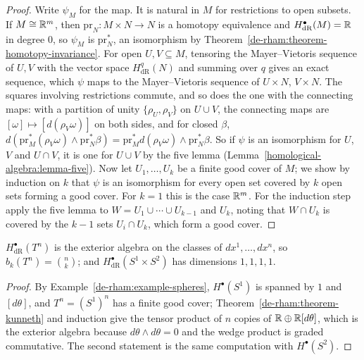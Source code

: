 \begin{proof}
Write $\psi_M$ for the map. It is natural in $M$ for restrictions to open subsets. If $M \cong \mathbb{R}^m$, then $\mathrm{pr}_N \colon M \times N \to N$ is a homotopy equivalence and $H^\bullet_{\mathrm{dR}}(M) = \mathbb{R}$ in degree $0$, so $\psi_M$ is
$\mathrm{pr}_N^*$, an isomorphism by Theorem~\ref{de-rham:theorem-homotopy-invariance}. For open $U, V \subseteq M$, tensoring the Mayer--Vietoris sequence of $U, V$ with the vector space $H^q_{\mathrm{dR}}(N)$ and summing over $q$ gives an
exact sequence, which $\psi$ maps to the Mayer--Vietoris sequence of $U \times N$, $V \times N$. The squares involving restrictions commute, and so does the one with the connecting maps: with a partition of unity $\{\rho_U, \rho_V\}$ on
$U \cup V$, the connecting maps are $[\omega] \mapsto [d(\rho_V\omega)]$ on both sides, and for closed $\beta$, $d(\mathrm{pr}_M^*(\rho_V\omega) \wedge \mathrm{pr}_N^*\beta) = \mathrm{pr}_M^*d(\rho_V\omega) \wedge \mathrm{pr}_N^*\beta$. So if $\psi$ is an isomorphism for $U$, $V$ and $U \cap V$, it is one for $U \cup V$
by the five lemma (Lemma~\ref{homological-algebra:lemma-five}). Now let $U_1, \ldots, U_k$ be a finite good cover of $M$; we show by induction on $k$ that $\psi$ is an isomorphism for every open set covered by $k$ open sets forming a good
cover. For $k = 1$ this is the case $\mathbb{R}^m$. For the induction step apply the five lemma to $W = U_1 \cup \cdots \cup U_{k-1}$ and $U_k$, noting that $W \cap U_k$ is covered by the $k - 1$ sets $U_i \cap U_k$, which form a good cover.
\end{proof}

\begin{corollary}\label{de-rham:corollary-torus}
$H^\bullet_{\mathrm{dR}}(T^n)$ is the exterior algebra on the classes of $dx^1, \ldots, dx^n$, so $b_k(T^n) = \binom nk$; and $H^\bullet_{\mathrm{dR}}(S^1 \times S^2)$ has dimensions $1, 1, 1, 1$.
\end{corollary}

\begin{proof}
By Example~\ref{de-rham:example-spheres}, $H^\bullet(S^1)$ is spanned by $1$ and $[d\theta]$, and $T^n = (S^1)^n$ has a finite good cover; Theorem~\ref{de-rham:theorem-kunneth} and induction give the tensor product of $n$ copies of
$\mathbb{R} \oplus \mathbb{R}[d\theta]$, which is the exterior algebra because $d\theta \wedge d\theta = 0$ and the wedge product is graded commutative. The second statement is the same computation with $H^\bullet(S^2)$.
\end{proof}

